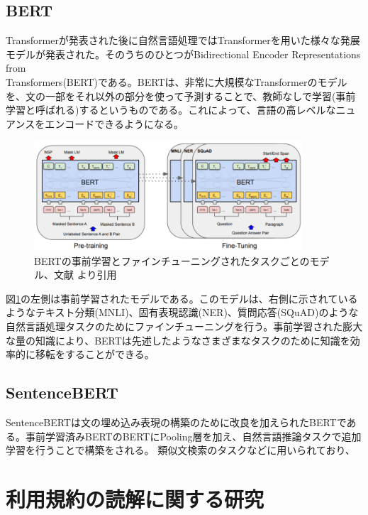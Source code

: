 \subsection{BERT}
Transformerが発表された後に自然言語処理ではTransformerを用いた様々な発展モデルが発表された。そのうちのひとつがBidirectional Encoder Representations from \\Transformers(BERT)\cite{https://doi.org/10.48550/arxiv.1810.04805}である。BERTは、非常に大規模なTransformerのモデルを、文の一部をそれ以外の部分を使って予測することで、教師なしで学習(事前学習と呼ばれる)するというものである。これによって、言語の高レベルなニュアンスをエンコードできるようになる\cite{Sowmya_Vajjala2022-02-04}。
\begin{figure}[h]
  \begin{center}
      \includegraphics[width=10cm]{img/BERT-method.png}
      \caption{BERTの事前学習とファインチューニングされたタスクごとのモデル、文献\cite{https://doi.org/10.48550/arxiv.1810.04805} より引用}
      \label{img:BERT-method}
  \end{center}
\end{figure}
図\ref{img:BERT-method}の左側は事前学習されたモデルである。このモデルは、右側に示されているようなテキスト分類(MNLI)、固有表現認識(NER)、質問応答(SQuAD)のような自然言語処理タスクのためにファインチューニングを行う。事前学習された膨大な量の知識により、BERTは先述したようなさまざまなタスクのために知識を効率的に移転をすることができる。


\subsection{SentenceBERT}
SentenceBERT\cite{arxiv.1908.10084}は文の埋め込み表現の構築のために改良を加えられたBERTである。事前学習済みBERTのBERTにPooling層を加え、自然言語推論タスクで追加学習を行うことで構築をされる。
類似文検索のタスクなどに用いられており、

\section{利用規約の読解に関する研究}
